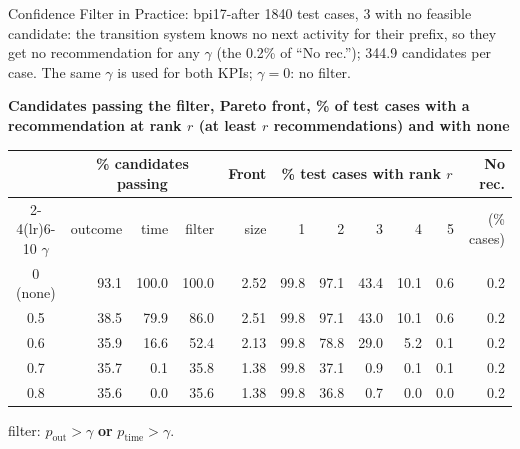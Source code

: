 \documentclass[aspectratio=169]{beamer} %
\begin{document}
\begin{frame}{Confidence Filter in Practice: bpi17-after}
  \small
  1840 test cases, \alert{3 with no feasible candidate}: the transition system knows no next
  activity for their prefix, so they get no recommendation for any $\gamma$ (the 0.2\% of ``No rec.'');
  344.9 candidates per case. The same $\gamma$ is used for both KPIs; $\gamma = 0$: no filter.

  \textbf{Candidates passing the filter, Pareto front, \% of test cases with a recommendation at rank $r$ (at least $r$ recommendations) and with none}
  \begin{center}\setlength{\tabcolsep}{4pt}\setlength{\aboverulesep}{0pt}\setlength{\belowrulesep}{1pt}
  \begin{tabular}{crrrrrrrrrr}
    \toprule
     & \multicolumn{3}{c}{\% candidates passing} & Front & \multicolumn{5}{c}{\% test cases with rank $r$} & No rec. \\
    \cmidrule(lr){2-4}\cmidrule(lr){6-10}
    $\gamma$ & outcome & time & filter & size & 1 & 2 & 3 & 4 & 5 & (\% cases) \\
    \midrule
    0 (none) & 93.1  & 100.0 & 100.0 & 2.52 & 99.8 & 97.1 & 43.4 & 10.1 & 0.6 & 0.2 \\
    0.5      & 38.5  & 79.9  & 86.0  & 2.51 & 99.8 & 97.1 & 43.0 & 10.1 & 0.6 & 0.2 \\
    0.6      & 35.9  & 16.6  & 52.4  & 2.13 & 99.8 & 78.8 & 29.0 & 5.2  & 0.1 & 0.2 \\
    0.7      & 35.7  & 0.1   & 35.8  & 1.38 & 99.8 & 37.1 & 0.9  & 0.1  & 0.1 & 0.2 \\
    0.8      & 35.6  & 0.0   & 35.6  & 1.38 & 99.8 & 36.8 & 0.7  & 0.0  & 0.0 & 0.2 \\
    \bottomrule
  \end{tabular}
  \end{center}
  {\scriptsize filter: $p_{\text{out}} > \gamma$ \textbf{or} $p_{\text{time}} > \gamma$.}
\end{frame}
\end{document}
